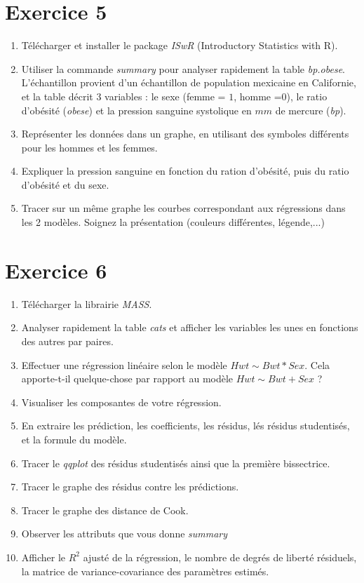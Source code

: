\section{Exercice 5}

\begin{enumerate}
\item Télécharger et installer le package \textit{ISwR} (Introductory Statistics with R).
\item Utiliser la commande \textit{summary} pour analyser rapidement la table \textit{bp.obese}. L'échantillon provient d'un échantillon de population mexicaine en Californie, et la table décrit $3$ variables : le sexe (femme = $1$, homme =$0$), le ratio d'obésité (\textit{obese}) et la pression sanguine systolique en $mm$ de mercure (\textit{bp}).
\item Représenter les données dans un graphe, en utilisant des symboles différents pour les hommes et les femmes.
\item Expliquer la pression sanguine en fonction du ration d'obésité, puis du ratio d'obésité et du sexe.
\item Tracer sur un même graphe les courbes correspondant aux régressions dans les 2 modèles. Soignez la présentation (couleurs différentes, légende,...)
\end{enumerate}

\section{Exercice 6}
\begin{enumerate}
\item Télécharger la librairie \textit{MASS}.
\item Analyser rapidement la table \textit{cats} et afficher les variables les unes en fonctions des autres par paires.
\item Effectuer une régression linéaire selon le modèle $Hwt \sim Bwt * Sex $. Cela apporte-t-il quelque-chose par rapport au modèle $Hwt \sim Bwt + Sex $ ? 
\item Visualiser les composantes de votre régression.
\item En extraire les prédiction, les coefficients, les résidus, lés résidus studentisés, et la formule du modèle.
\item Tracer le \textit{qqplot} des résidus studentisés ainsi que la première bissectrice.
\item Tracer le graphe des résidus contre les prédictions.
\item Tracer le graphe des distance de Cook.
\item Observer les attributs que vous donne \textit{summary}
\item Afficher le $R^2$ ajusté de la régression, le nombre de degrés de liberté résiduels, la matrice de variance-covariance des paramètres estimés. 
\end{enumerate}

